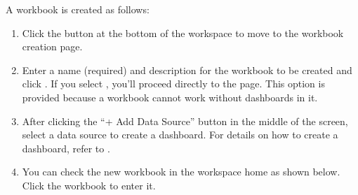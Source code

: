 \documentclass[letterpaper,10pt,english]{sphinxmanual}
\begin{document}
A workbook is created as follows:
\begin{enumerate}
\def\theenumi{\arabic{enumi}}
\def\labelenumi{\theenumi .}
\makeatletter\def\p@enumii{\p@enumi \theenumi .}\makeatother
\item {} 
Click the  button at the bottom of the workspace to move to the workbook creation page.
\begin{quote}

\begin{figure}[H]
\centering

\noindent{}
\end{figure}
\end{quote}

\item {} 
Enter a name (required) and description for the workbook to be created and click . If you select , you’ll proceed directly to the  page. This option is provided because a workbook cannot work without dashboards in it.
\begin{quote}

\begin{figure}[H]
\centering

\noindent{}
\end{figure}
\end{quote}

\item {} 
After clicking the “+ Add Data Source” button in the middle of the screen, select a data source to create a dashboard. For details on how to create a dashboard, refer to {\hyperref[\detokenize{discovery/part04/create_a_dashboard::doc}]{}}.
\begin{quote}

\begin{figure}[H]
\centering

\noindent{}
\end{figure}

\begin{figure}[H]
\centering

\noindent{}
\end{figure}
\end{quote}

\item {} 
You can check the new workbook in the workspace home as shown below. Click the workbook to enter it.
\begin{quote}

\begin{figure}[H]
\centering

\noindent{}
\end{figure}
\end{quote}

\end{enumerate}
\end{document}
